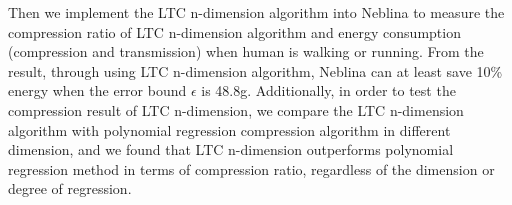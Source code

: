 Then we implement the LTC n-dimension algorithm into Neblina to measure the
compression ratio of LTC n-dimension algorithm and energy consumption
(compression and transmission) when human is walking or running. From the
result, through using LTC n-dimension algorithm, Neblina can at least save 10\%
energy when the error bound $\epsilon$ is 48.8g. Additionally, in order to test
the compression result of LTC n-dimension, we compare the LTC n-dimension
algorithm with polynomial regression compression algorithm in different
dimension, and we found that LTC n-dimension outperforms polynomial regression
method in terms of compression ratio, regardless of the dimension or degree of
regression.











